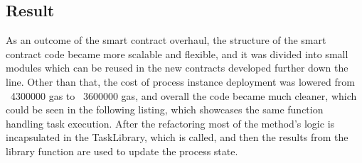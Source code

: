 \pagebreak

\subsection{Result}
\label{sec:impr:eth:result}

As an outcome of the smart contract overhaul, the structure of the smart contract code became more scalable and flexible, and it was divided into small modules which can be reused in the new contracts developed further down the line.
Other than that, the cost of process instance deployment was lowered from ~4300000 gas to ~3600000 gas, and overall the code became much cleaner, which could be seen in the following listing, which showcases the same function handling task execution. After the refactoring most of the method's logic is incapsulated in the TaskLibrary, which is called, and then the results from the library function are used to update the process state.



 

